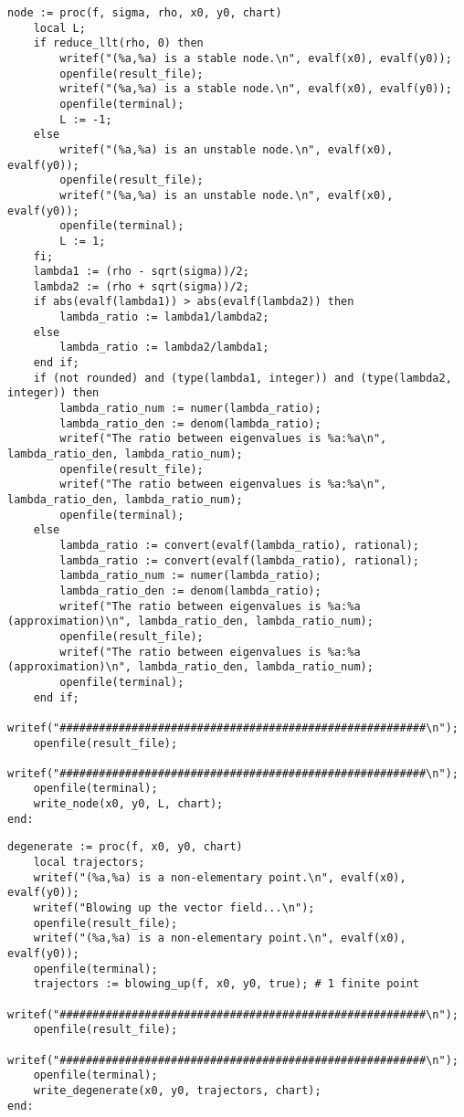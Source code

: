 \documentclass[a4paper,10pt]{article}
\begin{document}
\begin{lstlisting}[name=type]
node := proc(f, sigma, rho, x0, y0, chart)
    local L;
    if reduce_llt(rho, 0) then
        writef("(%a,%a) is a stable node.\n", evalf(x0), evalf(y0));
        openfile(result_file);
        writef("(%a,%a) is a stable node.\n", evalf(x0), evalf(y0));
        openfile(terminal);
        L := -1;
    else
        writef("(%a,%a) is an unstable node.\n", evalf(x0), evalf(y0));
        openfile(result_file);
        writef("(%a,%a) is an unstable node.\n", evalf(x0), evalf(y0));
        openfile(terminal);
        L := 1;
    fi;
    lambda1 := (rho - sqrt(sigma))/2;
    lambda2 := (rho + sqrt(sigma))/2;
    if abs(evalf(lambda1)) > abs(evalf(lambda2)) then
        lambda_ratio := lambda1/lambda2;
    else
        lambda_ratio := lambda2/lambda1;
    end if;
    if (not rounded) and (type(lambda1, integer)) and (type(lambda2, integer)) then 
        lambda_ratio_num := numer(lambda_ratio);
        lambda_ratio_den := denom(lambda_ratio);
        writef("The ratio between eigenvalues is %a:%a\n", lambda_ratio_den, lambda_ratio_num);
        openfile(result_file);
        writef("The ratio between eigenvalues is %a:%a\n", lambda_ratio_den, lambda_ratio_num);
        openfile(terminal);
    else
        lambda_ratio := convert(evalf(lambda_ratio), rational);
        lambda_ratio := convert(evalf(lambda_ratio), rational);
        lambda_ratio_num := numer(lambda_ratio);
        lambda_ratio_den := denom(lambda_ratio);
        writef("The ratio between eigenvalues is %a:%a (approximation)\n", lambda_ratio_den, lambda_ratio_num);
        openfile(result_file);
        writef("The ratio between eigenvalues is %a:%a (approximation)\n", lambda_ratio_den, lambda_ratio_num);
        openfile(terminal);
    end if;
    writef("########################################################\n");
    openfile(result_file);
    writef("########################################################\n");
    openfile(terminal);
    write_node(x0, y0, L, chart);
end:
\end{lstlisting}

\begin{lstlisting}[name=type]
degenerate := proc(f, x0, y0, chart)
    local trajectors;
    writef("(%a,%a) is a non-elementary point.\n", evalf(x0), evalf(y0));
    writef("Blowing up the vector field...\n");
    openfile(result_file);
    writef("(%a,%a) is a non-elementary point.\n", evalf(x0), evalf(y0));
    openfile(terminal);
    trajectors := blowing_up(f, x0, y0, true); # 1 finite point
    writef("########################################################\n");
    openfile(result_file);
    writef("########################################################\n");
    openfile(terminal);
    write_degenerate(x0, y0, trajectors, chart);
end:
\end{lstlisting}
\end{document}
